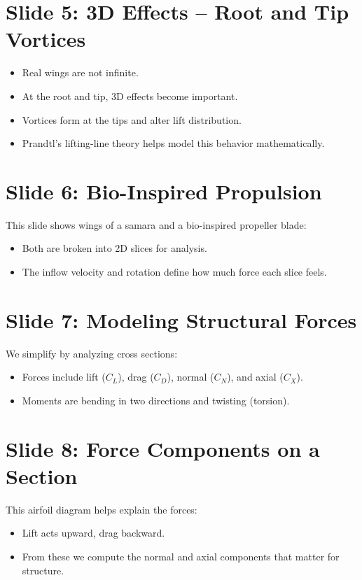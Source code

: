 \documentclass[12pt]{article}
\begin{document}
\section*{Slide 5: 3D Effects – Root and Tip Vortices}
\begin{itemize}
    \item Real wings are not infinite.
    \item At the root and tip, 3D effects become important.
    \item Vortices form at the tips and alter lift distribution.
    \item Prandtl’s lifting-line theory helps model this behavior mathematically.
\end{itemize}

\section*{Slide 6: Bio-Inspired Propulsion}
This slide shows wings of a samara and a bio-inspired propeller blade:
\begin{itemize}
    \item Both are broken into 2D slices for analysis.
    \item The inflow velocity and rotation define how much force each slice feels.
\end{itemize}

\section*{Slide 7: Modeling Structural Forces}
We simplify by analyzing cross sections:
\begin{itemize}
    \item Forces include lift ($C_L$), drag ($C_D$), normal ($C_N$), and axial ($C_X$).
    \item Moments are bending in two directions and twisting (torsion).
\end{itemize}

\section*{Slide 8: Force Components on a Section}
This airfoil diagram helps explain the forces:
\begin{itemize}
    \item Lift acts upward, drag backward.
    \item From these we compute the normal and axial components that matter for structure.
\end{itemize}
\end{document}
